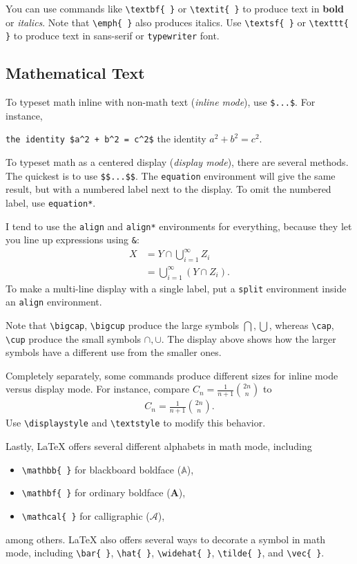 \documentclass[a4paper,10pt,leqno]{article}
\numberwithin{equation}{section}
\theoremstyle{plain}
\theoremstyle{definition}
\theoremstyle{remark}
\begin{document}
You can use commands like \verb|\textbf{ }| or  \verb|\textit{ }| to produce text in \textbf{bold} or \textit{italics}.
Note that \verb|\emph{ }| also produces italics.
Use \verb|\textsf{ }| or \verb|\texttt{ }| to produce text in \textsf{sans-serif} or \texttt{typewriter} font.

\subsection{Mathematical Text}

To typeset math inline with non-math text (\emph{inline mode}), use \verb|$...$|.
For instance,
\begin{center}
\verb|the identity $a^2 + b^2 = c^2$|
\quad
the identity $a^2 + b^2 = c^2$.
\end{center}
To typeset math as a centered display (\emph{display mode}), there are several methods.
The quickest is to use \verb|$$...$$|.
The \texttt{equation} environment will give the same result, but with a numbered label next to the display.
To omit the numbered label, use \texttt{equation*}.

I tend to use the \texttt{align} and \texttt{align*} environments for everything, because they let you line up expressions using \verb|&|:
\begin{align}\label{eq:1}
X 
	&= Y \cap \bigcup_{i = 1}^\infty Z_i\\
	&= \bigcup_{i = 1}^\infty {(Y \cap Z_i)}.
\end{align}
To make a multi-line display with a single label, put a \texttt{split} environment inside an \texttt{align} environment.

Note that \verb|\bigcap|, \verb|\bigcup| produce the large symbols $\bigcap, \bigcup$, whereas \verb|\cap|, \verb|\cup| produce the small symbols $\cap, \cup$.
The display above shows how the larger symbols have a different use from the smaller ones.

Completely separately, some commands produce different sizes for inline mode versus display mode.
For instance, compare $C_n = \frac{1}{n + 1} \binom{2n}{n}$ to
\begin{align*}
C_n = \frac{1}{n + 1} \binom{2n}{n}.
\end{align*}
Use \verb|\displaystyle| and \verb|\textstyle| to modify this behavior.

Lastly, \LaTeX{} offers several different alphabets in math mode, including
\begin{itemize} 
\item 	\verb|\mathbb{ }| for blackboard boldface ($\mathbb{A}$),

\item 	\verb|\mathbf{ }| for ordinary boldface ($\mathbf{A}$), 

\item 	\verb|\mathcal{ }| for calligraphic ($\mathcal{A}$),

\end{itemize}
among others.
\LaTeX{} also offers several ways to decorate a symbol in math mode, including \verb|\bar{ }|, \verb|\hat{ }|, \verb|\widehat{ }|, \verb|\tilde{ }|, and \verb|\vec{ }|.
\end{document}
